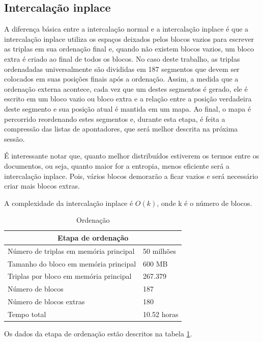 \documentclass{report}
\begin{document}
\subsection{Intercalação inplace}

A diferença básica entre a intercalação normal e a intercalação inplace é que a intercalação inplace utiliza os
espaços deixados pelos blocos vazios para escrever as triplas em sua ordenação final e, quando não existem blocos vazios,
um bloco extra é criado ao final de todos os blocos. No caso deste trabalho, as triplas ordenadadas universalmente são divididas em 187
segmentos que devem ser colocados em suas posições finais após a ordenação. Assim, a medida que a ordenação externa acontece, 
cada vez que um destes segmentos é gerado, ele é escrito em um bloco vazio ou bloco extra e a relação entre a posição verdadeira 
deste segmento e sua posição atual é mantida em um mapa.
Ao final, o mapa é percorrido reordenando estes segmentos e, durante esta etapa, é feita a compressão das listas de apontadores, que será
melhor descrita na próxima sessão.

É interessante notar que, quanto melhor distribuídos estiverem os termos entre os documentos, ou seja, quanto maior for a entropia, 
menos eficiente será a intercalação inplace. Pois, vários blocos demorarão a ficar vazios e será necessário criar mais blocos extras.

A complexidade da intercalação inplace é $ O(k) $, onde k é o número de blocos.

\begin{table}
\centering
\begin{tabular}{ |l|l| }
  \hline
  \multicolumn{2}{|c|}{Etapa de ordenação} \\
  \hline
  Número de triplas em memória principal & 50 milhões \\
  Tamanho do bloco em memória principal & 600 MB \\
  Triplas por bloco em memória principal & 267.379 \\
  Número de blocos & 187 \\
  Número de blocos extras & 180 \\
  Tempo total & 10.52 horas \\
  \hline
\end{tabular}
\caption{Ordenação}
\label{tab:sort}
\end{table}

Os dados da etapa de ordenação estão descritos na tabela \ref{tab:sort}.
\end{document}
